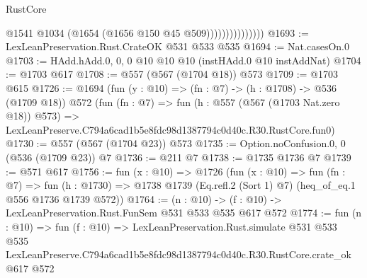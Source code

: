 \begin{lexlean}{RustCore}
\begin{coremodule}
                              @1541
                              @1034
                              (@1654 (@1656 @150 @45 @509)))))))))))))))
@1693 := LexLeanPreservation.Rust.CrateOK @531 @533 @535
@1694 := Nat.casesOn.{0}
@1703 := HAdd.hAdd.{0, 0, 0} @10 @10 @10 (instHAdd.{0} @10 instAddNat)
@1704 := @1703 @617
@1708 := @557 (@567 (@1704 @18)) @573
@1709 := @1703 @615
@1726 := @1694
    (fun (y : @10) => (fn : @7) -> (h : @1708) -> @536 (@1709 @18))
    @572
    (fun (fn : @7) =>
    fun (h : @557 (@567 (@1703 Nat.zero @18)) @573) =>
    LexLeanPreserve.C794a6cad1b5e8fdc98d1387794c0d40c.R30.RustCore.fun0)
@1730 := @557 (@567 (@1704 @23)) @573
@1735 := Option.noConfusion.{0, 0} (@536 (@1709 @23)) @7
@1736 := @211 @7
@1738 := @1735 @1736 @7
@1739 := @571 @617
@1756 := fun (x : @10) =>
  @1726
    (fun (x : @10) =>
    fun (fn : @7) =>
    fun (h : @1730) => @1738 @1739 (Eq.refl.{2} (Sort 1) @7) (heq_of_eq.{1} @556 @1736 @1739 @572))
@1764 := (n : @10) -> (f : @10) -> LexLeanPreservation.Rust.FunSem @531 @533 @535 @617 @572
@1774 := fun (n : @10) =>
  fun (f : @10) =>
  LexLeanPreservation.Rust.simulate
    @531
    @533
    @535
    LexLeanPreserve.C794a6cad1b5e8fdc98d1387794c0d40c.R30.RustCore.crate_ok
    @617
    @572
\end{coremodule}
\end{lexlean}
